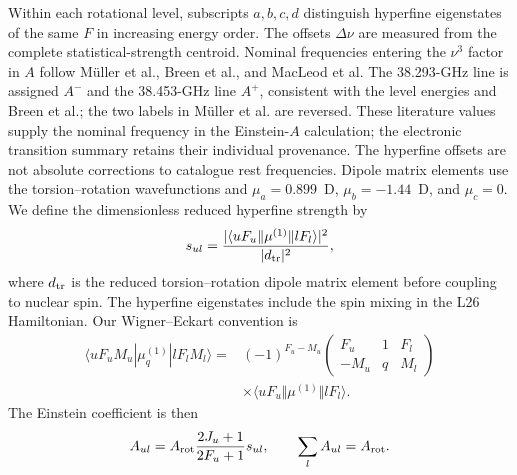 Within each rotational level, subscripts $a,b,c,d$ distinguish
hyperfine eigenstates of the same $F$ in increasing energy order.
The offsets $\Delta\nu$ are measured from the complete
statistical-strength centroid.
Nominal frequencies entering the $\nu^3$ factor in $A$ follow
M\"uller et al.,\cite{Mueller2004} Breen et al.,\cite{Breen2019ZeemanSM}
and MacLeod et al.\cite{MacLeod2019ZeemanSM}
The 38.293-GHz line is assigned $A^-$ and the 38.453-GHz line $A^+$,
consistent with the level energies and Breen et al.; the two labels
in M\"uller et al. are reversed.
These literature values supply the nominal frequency in the Einstein-$A$ calculation; the electronic transition summary retains their individual provenance. The hyperfine offsets are not absolute corrections to catalogue rest frequencies.
Dipole matrix elements use the torsion--rotation wavefunctions and
$\mu_a=0.899$~D, $\mu_b=-1.44$~D, and $\mu_c=0$.
We define the dimensionless reduced hyperfine strength by
\begin{equation}
s_{ul}=\frac{|\langle uF_u\Vert\mu^{(1)}\Vert lF_l\rangle|^2}{|d_{\rm tr}|^2},
\end{equation}
where $d_{\rm tr}$ is the reduced torsion--rotation dipole matrix element before coupling to nuclear spin. The hyperfine eigenstates include the spin mixing in the L26 Hamiltonian. Our Wigner--Eckart convention is
\begin{equation}
\begin{aligned}
\langle uF_uM_u|\mu^{(1)}_q|lF_lM_l\rangle
={}&(-1)^{F_u-M_u}
\begin{pmatrix}F_u&1&F_l\\-M_u&q&M_l\end{pmatrix}\\
&\times\langle uF_u\Vert\mu^{(1)}\Vert lF_l\rangle .
\end{aligned}
\end{equation}
The Einstein coefficient is then
\begin{equation}
A_{ul}=A_{\rm rot}\frac{2J_u+1}{2F_u+1}s_{ul},
\qquad \sum_l A_{ul}=A_{\rm rot}.
\end{equation}

